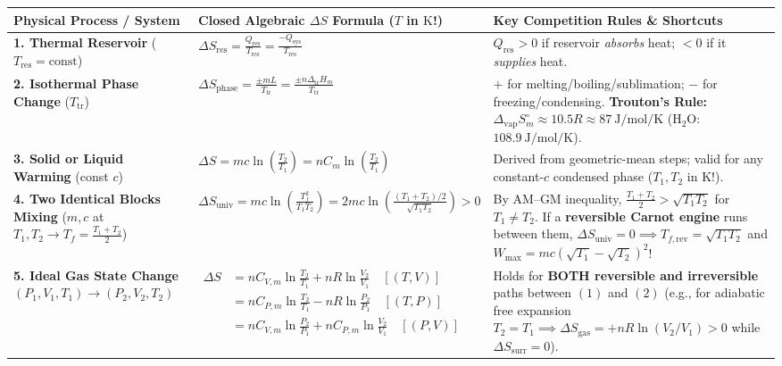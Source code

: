 \begin{formulacard}
\par\smallskip\noindent
\footnotesize\setlength{\tabcolsep}{3.5pt}\renewcommand{\arraystretch}{1.20}
\begin{tabularx}{\linewidth}{@{}l l X@{}}
\toprule
\textbf{Physical Process / System} & \textbf{Closed Algebraic $\Delta S$ Formula ($T$ in $\si{\kelvin}$!)} & \textbf{Key Competition Rules \& Shortcuts} \\
\midrule
\textbf{1. Thermal Reservoir} ($T_{\mathrm{res}} = \mathrm{const}$) & $\displaystyle \Delta S_{\mathrm{res}} = \frac{Q_{\mathrm{res}}}{T_{\mathrm{res}}} = \frac{-Q_{\mathrm{sys}}}{T_{\mathrm{res}}}$ & $Q_{\mathrm{res}} > 0$ if reservoir \emph{absorbs} heat; $<0$ if it \emph{supplies} heat. \\[5pt]
\textbf{2. Isothermal Phase Change} ($T_{\mathrm{tr}}$) & $\displaystyle \Delta S_{\mathrm{phase}} = \frac{\pm m L}{T_{\mathrm{tr}}} = \frac{\pm n\Delta_{\mathrm{tr}}H_m}{T_{\mathrm{tr}}}$ & $+$ for melting/boiling/sublimation; $-$ for freezing/condensing. \textbf{Trouton's Rule:} $\Delta_{\mathrm{vap}}S_m^\circ \approx 10.5R \approx \SI{87}{\joule\per\mole\per\kelvin}$ ($\mathrm{H_2O}$: $\SI{108.9}{\joule\per\mole\per\kelvin}$). \\[5pt]
\textbf{3. Solid or Liquid Warming} (const $c$) & $\displaystyle \Delta S = mc\ln\left(\frac{T_2}{T_1}\right) = nC_m\ln\left(\frac{T_2}{T_1}\right)$ & Derived from geometric-mean steps; valid for any constant-$c$ condensed phase ($T_1, T_2$ in $\si{\kelvin}$!). \\[5pt]
\textbf{4. Two Identical Blocks Mixing} ($m, c$ at $T_1, T_2 \to T_f = \frac{T_1+T_2}{2}$) & $\displaystyle \Delta S_{\mathrm{univ}} = mc\ln\left(\frac{T_f^2}{T_1 T_2}\right) = 2mc\ln\left(\frac{(T_1+T_2)/2}{\sqrt{T_1 T_2}}\right) > 0$ & By AM--GM inequality, $\frac{T_1+T_2}{2} > \sqrt{T_1 T_2}$ for $T_1 \ne T_2$. If a \textbf{reversible Carnot engine} runs between them, $\Delta S_{\mathrm{univ}}=0 \implies \boxed{T_{f,\mathrm{rev}} = \sqrt{T_1 T_2}}$ and $\boxed{W_{\max} = mc(\sqrt{T_1}-\sqrt{T_2})^2}$! \\[5pt]
\textbf{5. Ideal Gas State Change} $(P_1,V_1,T_1)\to(P_2,V_2,T_2)$ & $\displaystyle \begin{aligned}\Delta S &= nC_{V,m}\ln\frac{T_2}{T_1} + nR\ln\frac{V_2}{V_1} \quad [(T,V)]\\ &= nC_{P,m}\ln\frac{T_2}{T_1} - nR\ln\frac{P_2}{P_1} \quad [(T,P)]\\ &= nC_{V,m}\ln\frac{P_2}{P_1} + nC_{P,m}\ln\frac{V_2}{V_1} \quad [(P,V)]\end{aligned}$ & Holds for \textbf{BOTH reversible and irreversible} paths between $(1)$ and $(2)$ (e.g., for adiabatic free expansion $T_2=T_1 \implies \Delta S_{\mathrm{gas}} = +nR\ln(V_2/V_1) > 0$ while $\Delta S_{\mathrm{surr}} = 0$). \\[5pt]

\end{tabularx}
\end{formulacard}
